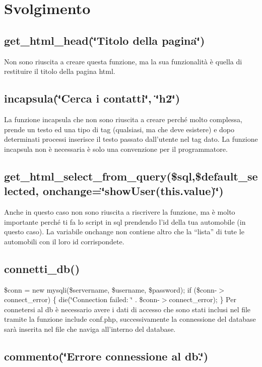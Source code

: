 \section*{Svolgimento}

\subsection*{get\+\_\+html\+\_\+head(\char`\"{}\+Titolo della pagina\char`\"{})}

Non sono riuscita a creare questa funzione, ma la sua funzionalità è quella di restituire il titolo della pagina html. \subsection*{incapsula(\char`\"{}\+Cerca i contatti\char`\"{}, \char`\"{}h2\char`\"{})}

La funzione incapsula che non sono riuscita a creare perché molto complessa, prende un testo ed una tipo di tag (qualsiasi, ma che deve esistere) e dopo determinati processi inserisce il testo passato dall’utente nel tag dato. La funzione incapsula non è necessaria è solo una convenzione per il programmatore. \subsection*{get\+\_\+html\+\_\+select\+\_\+from\+\_\+query(\$sql,\$default\+\_\+selected, \textquotesingle{}onchange=\char`\"{}show\+User(this.\+value)\char`\"{}\textquotesingle{})}

Anche in questo caso non sono riuscita a riscrivere la funzione, ma è molto importante perché ti fa lo script in sql prendendo l’id della tua automobile (in questo caso). La variabile onchange non contiene altro che la “lista” di tute le automobili con il loro id corrispondete. \subsection*{connetti\+\_\+db()}

\$conn = new mysqli(\$servername, \$username, \$password); if (\$conn-\/$>$connect\+\_\+error) \{ die(\char`\"{}\+Connection failed\+: \char`\"{} . \$conn-\/$>$connect\+\_\+error); \} Per connetersi al db è necessario avere i dati di accesso che sono stati inclusi nel file tramite la funzione include \textquotesingle{}conf.\+php\textquotesingle{}, successivamente la connessione del database sarà inserita nel file che naviga all’interno del database. \subsection*{commento(\char`\"{}\+Errore connessione al db.\char`\"{})}

